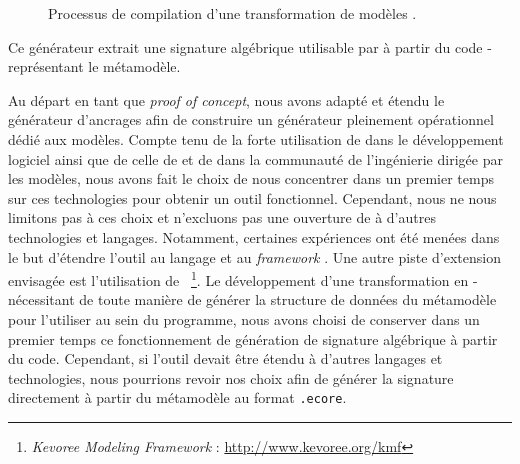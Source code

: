 \begin{figure}[h]
  \begin{center}
    
  \end{center}
  \caption{Processus de compilation d'une transformation de modèles {\tomemf}.}
  \label{fig:tomEMF}
\end{figure}

%
%

Ce générateur extrait une signature algébrique utilisable par {\tom} à partir
du code {\java-\emf} représentant le métamodèle.



Au départ en tant que \emph{proof of concept}, nous avons adapté et étendu le
générateur d'ancrages {\tomemf} afin de construire un générateur pleinement
opérationnel dédié aux modèles. Compte tenu de la forte utilisation de {\java}
dans le développement logiciel ainsi que de celle de {\eclipse} et de {\emf}
dans la communauté de l'ingénierie dirigée par les modèles, nous avons fait le
choix de nous concentrer dans un premier temps sur ces technologies pour
obtenir un outil fonctionnel. Cependant, nous ne nous limitons pas à ces choix
et n'excluons pas une ouverture de {\tomemf} à d'autres technologies et
langages. Notamment, certaines expériences ont été menées dans le but d'étendre
l'outil au langage {\ada} et au \emph{framework} {\gms}. Une autre piste
d'extension envisagée est l'utilisation de {\kmf}~\footnote{\emph{Kevoree
Modeling Framework} : \url{http://www.kevoree.org/kmf}}. Le développement d'une
transformation en {\java-\emf} nécessitant de toute manière de générer la
structure de données du métamodèle pour l'utiliser au sein du programme, nous
avons choisi de conserver dans un premier temps ce fonctionnement de génération
de signature algébrique à partir du code. Cependant, si l'outil devait être
étendu à d'autres langages et technologies, nous pourrions revoir nos choix
afin de générer la signature directement à partir du métamodèle au format
\texttt{.ecore}.


